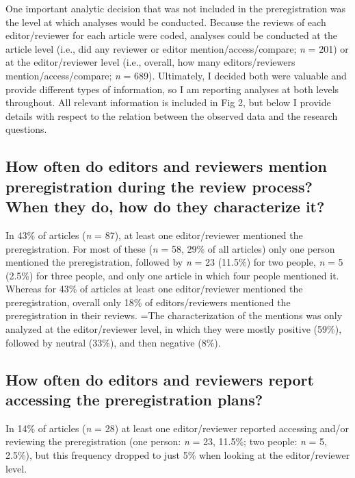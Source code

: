 \documentclass[authordate, empirical]{jote-new-article}
\begin{document}
	One important analytic decision that was not included in the preregistration was the level at which analyses would be conducted. Because the reviews of each editor/reviewer for each article were coded, analyses could be conducted at the article level (i.e., did any reviewer or editor mention/access/compare; \emph{n} = 201) or at the editor/reviewer level (i.e., overall, how many editors/reviewers mention/access/compare; \emph{n} = 689). Ultimately, I decided both were valuable and provide different types of information, so I am reporting analyses at both levels throughout. All relevant information is included in Fig 2, but below I provide details with respect to the relation between the observed data and the research questions.



	\subsection{How often do editors and reviewers mention preregistration during the review process? When they do, how do they characterize it?}



	In 43\% of articles (\emph{n} = 87), at least one editor/reviewer mentioned the preregistration. For most of these (\emph{n} = 58, 29\% of all articles) only one person mentioned the preregistration, followed by \emph{n} = 23 (11.5\%) for two people, \emph{n} = 5 (2.5\%) for three people, and only one article in which four people mentioned it. Whereas for 43\% of articles at least one editor/reviewer mentioned the preregistration, overall only 18\% of editors/reviewers mentioned the preregistration in their reviews. =The characterization of the mentions was only analyzed at the editor/reviewer level, in which they were mostly positive (59\%), followed by neutral (33\%), and then negative (8\%).

	

	\subsection{How often do editors and reviewers report accessing the preregistration plans?}



	In 14\% of articles (\emph{n} = 28) at least one editor/reviewer reported accessing and/or reviewing the preregistration (one person: \emph{n} = 23, 11.5\%; two people: \emph{n} = 5, 2.5\%), but this frequency dropped to just 5\% when looking at the editor/reviewer level.
\end{document}
